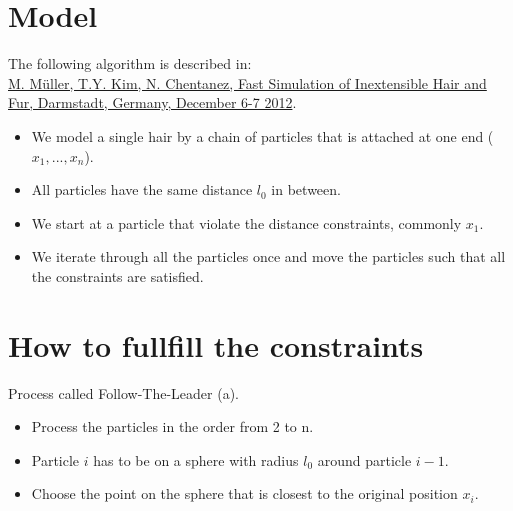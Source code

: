 \documentclass[
paper=192mm:144mm, %
fontsize=12pt, %
pagesize, %
parskip=half-, %
]{scrartcl} %
\theoremstyle{mythmstyle} %
\begin{document}
\clearpage


\section{\color{white}Model}

The following algorithm is described in:\\ \href{http://matthias-mueller-fischer.ch/publications/FTLHairFur.pdf}{M. Müller, T.Y. Kim, N. Chentanez,  Fast Simulation of Inextensible Hair and Fur, Darmstadt, Germany, December 6-7 2012}.

\begin{itemize}
\setlength\itemsep{-5mm}
\item We model a single hair by a chain of particles that is attached
at one end ($x_1,...,x_n$).
\item All particles have the same distance $l_0$ in between.
\item We start at a particle that violate the distance constraints, commonly $x_1$.
\item We iterate through all the particles once and move the particles such that all the constraints are satisfied.
\end{itemize}


\clearpage


\section{\color{white}How to fullfill the constraints}

Process called Follow-The-Leader (a).
\begin{itemize}
\setlength\itemsep{-5mm}
\item Process the particles in the order from 2 to n.
\item Particle $i$ has to be on a sphere with radius $l_0$ around particle $i-1$.
\item Choose the point on the sphere that is closest to the original position $x_i$.
\end{itemize}
\end{document}
